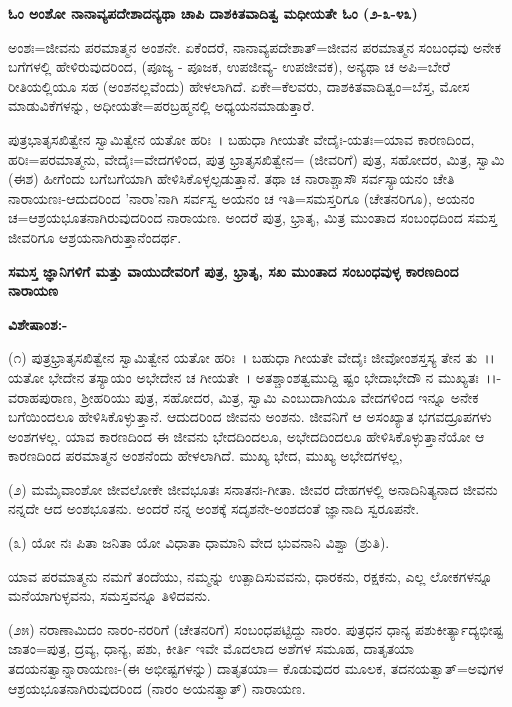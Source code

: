 \begin{center}
\textbf{ಓಂ ಅಂಶೋ ನಾನಾವ್ಯಪದೇಶಾದನ್ಯಥಾ ಚಾಪಿ ದಾಶಕಿತವಾದಿತ್ವ ಮಧೀಯತೇ ಓಂ (೨-೩-೪೩)}
\end{center}

ಅಂಶಃ=ಜೀವನು ಪರಮಾತ್ಮನ ಅಂಶನೇ. ಏಕೆಂದರೆ, ನಾನಾವ್ಯಪದೇಶಾತ್=ಜೀವನ ಪರಮಾತ್ಮನ ಸಂಬಂಧವು ಅನೇಕ ಬಗೆಗಳಲ್ಲಿ ಹೇಳಿರುವುದರಿಂದ, (ಪೂಜ್ಯ - ಪೂಜಕ, ಉಪಜೀವ್ಯ- ಉಪಜೀವಕ), ಅನ್ಯಥಾ ಚ ಅಪಿ=ಬೇರೆ ರೀತಿಯಲ್ಲಿಯೂ ಸಹ (ಅಂಶನಲ್ಲವೆಂದು) ಹೇಳಲಾಗಿದೆ. ಏಕೇ=ಕೆಲವರು, ದಾಶಕಿತವಾದಿತ್ವಂ=ಬೆಸ್ತ, ಮೋಸ ಮಾಡುವಿಕೆಗಳನ್ನು, ಅಧೀಯತೇ=ಪರಬ್ರಹ್ಮನಲ್ಲಿ ಅಧ್ಯಯನಮಾಡುತ್ತಾರೆ.

ಪುತ್ರಭಾತೃಸಖಿತ್ವೇನ ಸ್ವಾಮಿತ್ವೇನ ಯತೋ ಹರಿಃ~। ಬಹುಧಾ ಗೀಯತೇ ವೇದೈಃ-ಯತಃ=ಯಾವ ಕಾರಣದಿಂದ, ಹರಿಃ=ಪರಮಾತ್ಮನು, ವೇದೈಃ=ವೇದಗಳಿಂದ, ಪುತ್ರ ಭ್ರಾತೃಸಖಿತ್ವೇನ= (ಜೀವರಿಗೆ) ಪುತ್ರ, ಸಹೋದರ, ಮಿತ್ರ, ಸ್ವಾಮಿ (ಈಶ) ಹೀಗೆಂದು ಬಗೆಬಗೆಯಾಗಿ ಹೇಳಿಸಿಕೊಳ್ಳಲ್ಪಡುತ್ತಾನೆ. ತಥಾ ಚ ನಾರಾಶ್ಚಾಸೌ ಸರ್ವಸ್ಯಾಯನಂ ಚೇತಿ ನಾರಾಯಣಃ-ಆದುದರಿಂದ 'ನಾರಾ'ನಾಗಿ ಸರ್ವಸ್ವ ಅಯನಂ ಚ ಇತಿ=ಸಮಸ್ತರಿಗೂ (ಚೇತನರಿಗೂ), ಅಯನಂ ಚ=ಆಶ್ರಯಭೂತನಾಗಿರುವುದರಿಂದ ನಾರಾಯಣ. ಅಂದರೆ ಪುತ್ರ, ಭ್ರಾತೃ, ಮಿತ್ರ ಮುಂತಾದ ಸಂಬಂಧದಿಂದ ಸಮಸ್ತ ಜೀವರಿಗೂ ಆಶ್ರಯನಾಗಿರುತ್ತಾನೆಂದರ್ಥ.

\begin{center}
\textbf{ಸಮಸ್ತ ಜ್ಞಾನಿಗಳಿಗೆ ಮತ್ತು ವಾಯುದೇವರಿಗೆ ಪುತ್ರ, ಭ್ರಾತೃ, ಸಖ ಮುಂತಾದ ಸಂಬಂಧವುಳ್ಳ ಕಾರಣದಿಂದ ನಾರಾಯಣ}
\end{center}

\noindent
\textbf{ವಿಶೇಷಾಂಶ:-}

(೧) ಪುತ್ರಭ್ರಾತೃಸಖಿತ್ವೇನ ಸ್ವಾಮಿತ್ವೇನ ಯತೋ ಹರಿಃ~। ಬಹುಧಾ ಗೀಯತೇ ವೇದೈಃ ಜೀವೋಂಶಸ್ತಸ್ಯ ತೇನ ತು~।। ಯತೋ ಭೇದೇನ ತಸ್ಯಾಯಂ ಅಭೇದೇನ ಚ ಗೀಯತೇ~। ಅತಶ್ಚಾಂಶತ್ವಮುದ್ದಿ ಷ್ಟಂ ಭೇದಾಭೇದೌ ನ ಮುಖ್ಯತಃ~।।-ವರಾಹಪುರಾಣ, ಶ‍್ರೀಹರಿಯು ಪುತ್ರ, ಸಹೋದರ, ಮಿತ್ರ, ಸ್ವಾಮಿ ಎಂಬುದಾಗಿಯೂ ವೇದಗಳಿಂದ ಇನ್ನೂ ಅನೇಕ ಬಗೆಯಿಂದಲೂ ಹೇಳಿಸಿಕೊಳ್ಳುತ್ತಾನೆ. ಆದುದರಿಂದ ಜೀವನು ಅಂಶನು. ಜೀವನಿಗೆ ಆ ಅಸಂಖ್ಯಾತ ಭಗವದ್ರೂಪಗಳು ಅಂಶಗಳಲ್ಲ. ಯಾವ ಕಾರಣದಿಂದ ಈ ಜೀವನು ಭೇದದಿಂದಲೂ, ಅಭೇದದಿಂದಲೂ ಹೇಳಿಸಿಕೊಳ್ಳುತ್ತಾನೆಯೋ ಆ ಕಾರಣದಿಂದ ಪರಮಾತ್ಮನ ಅಂಶನೆಂದು ಹೇಳಲಾಗಿದೆ. ಮುಖ್ಯ ಭೇದ, ಮುಖ್ಯ ಅಭೇದಗಳಲ್ಲ,

(೨) ಮಮೈವಾಂಶೋ ಜೀವಲೋಕೇ ಜೀವಭೂತಃ ಸನಾತನಃ-ಗೀತಾ. ಜೀವರ ದೇಹಗಳಲ್ಲಿ ಅನಾದಿನಿತ್ಯನಾದ ಜೀವನು ನನ್ನದೇ ಆದ ಅಂಶಭೂತನು. ಅಂದರೆ ನನ್ನ ಅಂಶಕ್ಕೆ ಸದೃಶನೇ-ಅಂಶದಂತೆ ಜ್ಞಾನಾದಿ ಸ್ವರೂಪನೇ.

(೩) ಯೋ ನಃ ಪಿತಾ ಜನಿತಾ ಯೋ ವಿಧಾತಾ ಧಾಮಾನಿ ವೇದ ಭುವನಾನಿ ವಿಶ್ವಾ (ಶ್ರುತಿ).

ಯಾವ ಪರಮಾತ್ಮನು ನಮಗೆ ತಂದೆಯು, ನಮ್ಮನ್ನು ಉತ್ಪಾದಿಸುವವನು, ಧಾರಕನು, ರಕ್ಷಕನು, ಎಲ್ಲ ಲೋಕಗಳನ್ನೂ ಮನೆಯಾಗುಳ್ಳವನು, ಸಮಸ್ತವನ್ನೂ ತಿಳಿದವನು.

(೨೫) ನರಾಣಾಮಿದಂ ನಾರಂ-ನರರಿಗೆ (ಚೇತನರಿಗೆ) ಸಂಬಂಧಪಟ್ಟಿದ್ದು ನಾರಂ. ಪುತ್ರಧನ ಧಾನ್ಯ ಪಶುಕೀರ್ತ್ಯಾದ್ಯಭೀಷ್ಟ ಜಾತಂ=ಪುತ್ರ, ದ್ರವ್ಯ, ಧಾನ್ಯ, ಪಶು, ಕೀರ್ತಿ ಇವೇ ಮೊದಲಾದ ಅಶೆಗಳ ಸಮೂಹ, ದಾತೃತಯಾ ತದಯನತ್ವಾನ್ನಾರಾಯಣಃ-(ಈ ಅಭೀಷ್ಟಗಳನ್ನು) ದಾತೃತಯಾ= ಕೊಡುವುದರ ಮೂಲಕ, ತದನಯತ್ವಾತ್=ಅವುಗಳ ಆಶ್ರಯಭೂತನಾಗಿರುವುದರಿಂದ (ನಾರಂ ಅಯನತ್ವಾತ್) ನಾರಾಯಣ.

